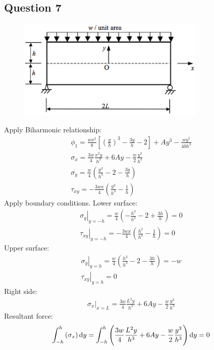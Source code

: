 \documentclass[11pt]{article}
\numberwithin{equation}{section}
\begin{document}
\subsection{Question 7}
\begin{figure}[H]
    \centering
    \includegraphics[width = 0.8\textwidth]{./img/diagram2.png}
    \caption{}
\end{figure}
Apply Biharmonic relationship:
\begin{gather}
    \phi_1 = \frac{wx^2}{8} \left[\left(\frac{y}{h}\right)^3-\frac{3y}{h} -2 \right] + Ay^3 - \frac{wy^5}{40h^3}\\
    \sigma_x = \frac{3w}{4}\frac{x^2y}{h^3} + 6Ay - \frac{w}{2}\frac{y^3}{h^3}\\
    \sigma_y = \frac{w}{4}\left(\frac{y^3}{h^3}-2-\frac{3y}{h}\right)\\
    \tau_{xy} = -\frac{3wx}{4}\left(\frac{y^2}{h^3} - \frac{1}{h}\right)
\end{gather}
Apply boundary conditions. Lower surface:
\begin{gather}
    \left. \sigma_y \right|_{y=-h} = \frac{w}{4}\left(-\frac{h^3}{h^3}-2 + \frac{3h}{h}\right) = 0\\
    \left. \tau_{xy}\right|_{y=-h} = -\frac{3wx}{4}\left(\frac{h^2}{h^3}-\frac{1}{h}\right) = 0
\end{gather}
Upper surface:
\begin{gather}
    \left. \sigma_y \right|_{y=h} = \frac{w}{4}\left(\frac{h^3}{h^3} - 2 - \frac{3h}{h}\right) = -w\\
    \left. \tau_{xy}\right|_{y=h} = 0
\end{gather}
Right side:
\begin{gather}
    \left. \sigma_x \right|_{x = L} = \frac{3w}{4}\frac{L^2y}{h^3} + 6Ay -\frac{w}{2}\frac{y^3}{h^3}
\end{gather}
Resultant force:
\begin{gather}
    \int_{-h}^h \left(\sigma_x\right)\dif y = \int_{-h}^h \left(\frac{3w}{4}\frac{L^2y}{h^3} + 6Ay -\frac{w}{2}\frac{y^3}{h^3}\right)\dif y = 0
\end{gather}
\end{document}
